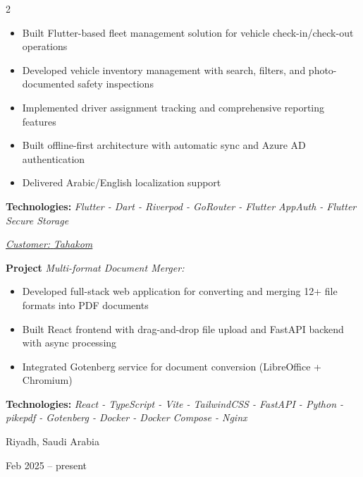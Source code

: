 \documentclass[10pt, a4paper]{article}
\newenvironment{highlights}{
    \begin{itemize}[
        topsep=0.10 cm,
        parsep=0.10 cm,
        partopsep=0pt,
        itemsep=0pt,
        leftmargin=0.4 cm + 10pt
    ]
}{
    \end{itemize}
} %
\newenvironment{twocolentry}[2][]{
    \onecolentry
    \def\secondColumn{#2}
    \setcolumnwidth{\fill, 4.5 cm}
    \begin{paracol}{2}
}{
    \switchcolumn \raggedleft \secondColumn
    \end{paracol}
    \endonecolentry
} %
\begin{document}
\begin{twocolentry}{
            \fontsize{14}{18}Riyadh, Saudi Arabia

        Feb 2025 – present
            \normalsize
        }
                \begin{highlights}
                        \item Built Flutter-based fleet management solution for vehicle check-in/check-out operations
                        \item Developed vehicle inventory management with search, filters, and photo-documented safety inspections
                        \item Implemented driver assignment tracking and comprehensive reporting features
                        \item Built offline-first architecture with automatic sync and Azure AD authentication
                        \item Delivered Arabic/English localization support
                \end{highlights}
                \faBuffer
                \textbf{ Technologies:} \textit{Flutter - Dart - Riverpod - GoRouter - Flutter AppAuth - Flutter Secure Storage}

                \vspace{0.10 cm}

                \vspace{0.10 cm}

                \textcolor{tertiaryColor}{\faAngleDoubleRight\hspace{0.1cm}\underline{\textit{Customer:} \textit{Tahakom}}}

                \vspace{0.2cm}
                \textbf{Project \faAngleRight} \textit{Multi-format Document Merger:}

                \begin{highlights}
                        \item Developed full-stack web application for converting and merging 12+ file formats into PDF documents
                        \item Built React frontend with drag-and-drop file upload and FastAPI backend with async processing
                        \item Integrated Gotenberg service for document conversion (LibreOffice + Chromium)
                \end{highlights}
                \faBuffer
                \textbf{ Technologies:} \textit{React - TypeScript - Vite - TailwindCSS - FastAPI - Python - pikepdf - Gotenberg - Docker - Docker Compose - Nginx}

                \vspace{0.10 cm}

        \end{twocolentry}
\end{document}

